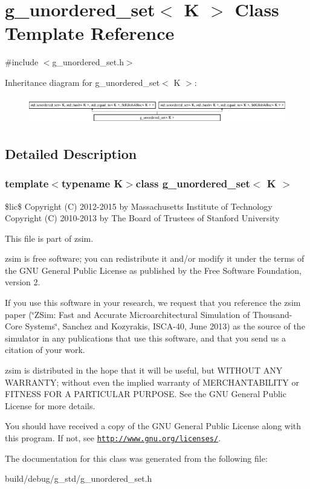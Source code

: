\hypertarget{classg__unordered__set}{\section{g\-\_\-unordered\-\_\-set$<$ K $>$ Class Template Reference}
\label{classg__unordered__set}
}


{\ttfamily \#include $<$g\-\_\-unordered\-\_\-set.\-h$>$}

Inheritance diagram for g\-\_\-unordered\-\_\-set$<$ K $>$\-:\begin{figure}[H]
\begin{center}
\leavevmode
\includegraphics[height=1.201717cm]{classg__unordered__set}
\end{center}
\end{figure}


\subsection{Detailed Description}
\subsubsection*{template$<$typename K$>$class g\-\_\-unordered\-\_\-set$<$ K $>$}

\$lic\$ Copyright (C) 2012-\/2015 by Massachusetts Institute of Technology Copyright (C) 2010-\/2013 by The Board of Trustees of Stanford University

This file is part of zsim.

zsim is free software; you can redistribute it and/or modify it under the terms of the G\-N\-U General Public License as published by the Free Software Foundation, version 2.

If you use this software in your research, we request that you reference the zsim paper (\char`\"{}\-Z\-Sim\-: Fast and Accurate Microarchitectural Simulation of
\-Thousand-\/\-Core Systems\char`\"{}, Sanchez and Kozyrakis, I\-S\-C\-A-\/40, June 2013) as the source of the simulator in any publications that use this software, and that you send us a citation of your work.

zsim is distributed in the hope that it will be useful, but W\-I\-T\-H\-O\-U\-T A\-N\-Y W\-A\-R\-R\-A\-N\-T\-Y; without even the implied warranty of M\-E\-R\-C\-H\-A\-N\-T\-A\-B\-I\-L\-I\-T\-Y or F\-I\-T\-N\-E\-S\-S F\-O\-R A P\-A\-R\-T\-I\-C\-U\-L\-A\-R P\-U\-R\-P\-O\-S\-E. See the G\-N\-U General Public License for more details.

You should have received a copy of the G\-N\-U General Public License along with this program. If not, see \href{http://www.gnu.org/licenses/}{\tt http\-://www.\-gnu.\-org/licenses/}. 

The documentation for this class was generated from the following file\-:\begin{DoxyCompactItemize}
\item 
build/debug/g\-\_\-std/g\-\_\-unordered\-\_\-set.\-h\end{DoxyCompactItemize}
